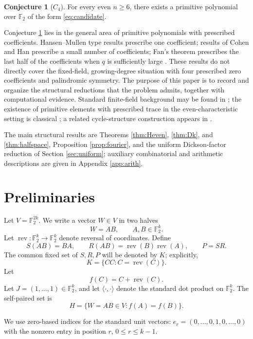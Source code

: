 \documentclass[11pt]{article}
\theoremstyle{definition}
\newtheorem{conjecture}[theorem]{Conjecture}
\theoremstyle{remark}
\begin{document}
\begin{conjecture}[$C_4$]\label{conj:C4}
For every even $n\ge 6$, there exists a primitive polynomial over $\mathbb F_2$ of the form \eqref{eq:candidate}.
\end{conjecture}

Conjecture \ref{conj:C4} lies in the general area of primitive polynomials with prescribed coefficients. Hansen--Mullen type results prescribe one coefficient; results of Cohen and Han prescribe a small number of coefficients; Fan's theorem prescribes the last half of the coefficients when $q$ is sufficiently large \cite{Coh06,Han04,Fan09,Gar11,Gao23}. These results do not directly cover the fixed-field, growing-degree situation with four prescribed zero coefficients and palindromic symmetry. The purpose of this paper is to record and organize the structural reductions that the problem admits, together with computational evidence. Standard finite-field background may be found in \cite{LN}; the existence of primitive elements with prescribed trace in the even-characteristic setting is classical \cite{Coh90,Mor,Coh03}; a related cycle-structure construction appears in \cite{GPT}.

The main structural results are Theorems \ref{thm:Heven}, \ref{thm:Dk}, and \ref{thm:halfspace}, Proposition \ref{prop:fourier}, and the uniform Dickson-factor reduction of Section \ref{sec:uniform}; auxiliary combinatorial and arithmetic descriptions are given in Appendix \ref{app:arith}.

\section{Preliminaries}
\label{sec:prelim}

Let $V=\mathbb F_2^{2k}$. We write a vector $W\in V$ in two halves
\[
W=AB,\qquad A,B\in\mathbb F_2^k.
\]
Let $\operatorname{rev}:\mathbb F_2^k\to\mathbb F_2^k$ denote reversal of coordinates. Define
\[
S(AB)=BA,\qquad R(AB)=\operatorname{rev}(B)\operatorname{rev}(A),\qquad P=SR.
\]
The common fixed set of $S,R,P$ will be denoted by $K$; explicitly,
\[
K=\{CC:C=\operatorname{rev}(C)\}.
\]
Let
\[
f(C)=C+\operatorname{rev}(C).
\]
Let \(J=(1,\ldots,1)\in\mathbb F_2^k\), and let \(\langle\cdot,\cdot\rangle\) denote the standard dot product on \(\mathbb F_2^k\).
The self-paired set is
\[
H=\{W=AB\in V: f(A)=f(B)\}.
\]

We use zero-based indices for the standard unit vectors: $e_r=(0,\ldots,0,1,0,\ldots,0)$ with the nonzero entry in position $r$, $0\le r\le k-1$.
\end{document}
